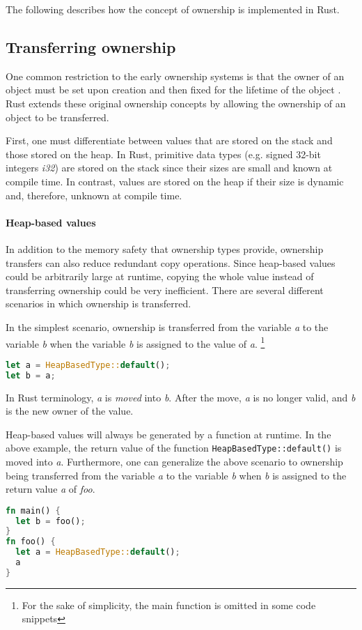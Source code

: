 \documentclass[sigplan,11pt,nonacm]{acmart}
\begin{document}
The following describes how the concept of ownership is implemented in Rust.


\subsection{Transferring ownership}
\label{sec:rust-transferring-ownership}

One common restriction to the early ownership systems is that the owner of an object must be set upon creation and then fixed for the lifetime of the object \cite{ownership-types-survey}.
Rust extends these original ownership concepts by allowing the ownership of an object to be transferred.

First, one must differentiate between values that are stored on the stack and those stored on the heap.
In Rust, primitive data types (e.g. signed 32-bit integers \emph{i32}) are stored on the stack since their sizes are small and known at compile time.
In contrast, values are stored on the heap if their size is dynamic and, therefore, unknown at compile time.

\paragraph{Heap-based values}

In addition to the memory safety that ownership types provide, ownership transfers can also reduce redundant copy operations.
Since heap-based values could be arbitrarily large at runtime, copying the whole value instead of transferring ownership could be very inefficient.
There are several different scenarios in which ownership is transferred.

In the simplest scenario, ownership is transferred from the variable \emph{a} to the variable \emph{b} when the variable \emph{b} is assigned to the value of \emph{a}.
\footnote{For the sake of simplicity, the main function is omitted in some code snippets}

\begin{lstlisting}[language=Rust]
let a = HeapBasedType::default();
let b = a;
\end{lstlisting}
In Rust terminology, \emph{a} is \emph{moved} into \emph{b}.
After the move, \emph{a} is no longer valid, and \emph{b} is the new owner of the value.

Heap-based values will always be generated by a function at runtime.
In the above example, the return value of the function \verb|HeapBasedType::default()| is moved into \emph{a}.
Furthermore, one can generalize the above scenario to ownership being transferred from the variable \emph{a} to the variable \emph{b} when \emph{b} is assigned to the return value \emph{a} of \emph{foo}.
\begin{lstlisting}[language=Rust]
fn main() {
  let b = foo();
}
fn foo() {
  let a = HeapBasedType::default();
  a
}
\end{lstlisting}
\end{document}
